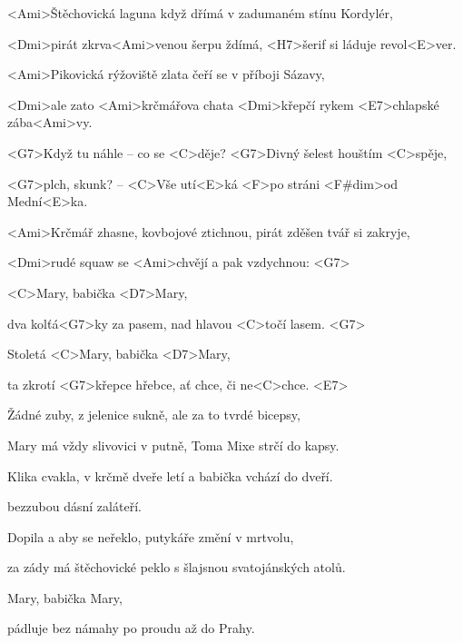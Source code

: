 

\zs
<Ami>Štěchovická laguna když dřímá v zadumaném stínu Kordylér, 

<Dmi>pirát zkrva<Ami>venou šerpu ždímá, <H7>šerif si láduje revol<E>ver. 

\bigskip

<Ami>Pikovická rýžoviště zlata čeří se v příboji Sázavy, 

<Dmi>ale zato <Ami>krčmářova chata <Dmi>křepčí rykem <E7>chlapské zába<Ami>vy. 

\bigskip

<G7>Když tu náhle -- co se <C>děje? <G7>Divný šelest houštím <C>spěje, 

<G7>plch, skunk? -- <C>Vše utí<E>ká <F>po stráni <F#dim>od Mední<E>ka. 

\bigskip

<Ami>Krčmář zhasne, kovbojové ztichnou, pirát zděšen tvář si zakryje, 

<Dmi>rudé squaw se <Ami>chvějí a pak vzdychnou:
<G7> \ks

\zr
<C>Mary, babička <D7>Mary, 

dva kolťá<G7>ky za pasem, nad hlavou <C>točí lasem. <G7>

Stoletá <C>Mary, babička <D7>Mary, 

ta zkrotí <G7>křepce hřebce, ať chce, či ne<C>chce. <E7> 
\kr

\zs
Žádné zuby, z jelenice sukně, ale za to tvrdé bicepsy, 

Mary má vždy slivovici v putně, Toma Mixe strčí do kapsy. 

\bigskip

Klika cvakla, v krčmě dveře letí a babička vchází do dveří.

 bezzubou dásní zaláteří. 

\bigskip


\bigskip

Dopila a aby se neřeklo, putykáře změní v mrtvolu, 

za zády má štěchovické peklo s šlajsnou svatojánských atolů. 
\ks

\zr
Mary, babička Mary, 

pádluje bez námahy po proudu až do Prahy. 

